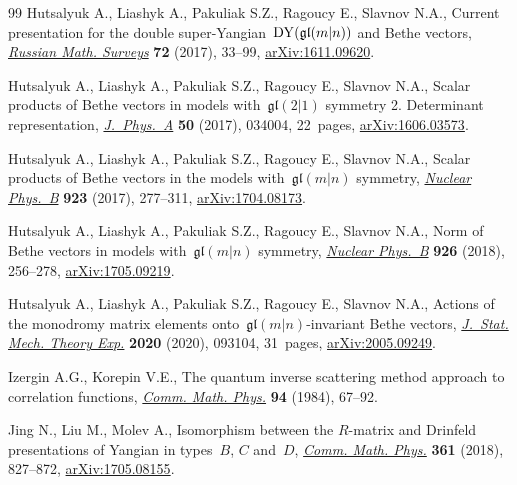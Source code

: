 \documentclass[pdftex]{sigma}
\theoremstyle{definition}
\begin{document}
\begin{thebibliography}{99}
Hutsalyuk A., Liashyk A., Pakuliak S.Z., Ragoucy E., Slavnov N.A., Current
 presentation for the double super-Yangian~${\rm DY}(\mathfrak{gl}(m|n))$ and Bethe
 vectors, \href{https://doi.org/10.1070/RM9754}{\textit{Russian Math.
 Surveys}} \textbf{72} (2017), 33--99,
 \href{http://arxiv.org/abs/1611.09620}{arXiv:1611.09620}.

Hutsalyuk A., Liashyk A., Pakuliak S.Z., Ragoucy E., Slavnov N.A., Scalar
 products of {B}ethe vectors in models with~{$\mathfrak{gl}(2|1)$} symmetry 2.
 {D}eterminant representation,
 \href{https://doi.org/10.1088/1751-8121/50/3/034004}{\textit{J.~Phys.~A}}
 \textbf{50} (2017), 034004, 22~pages,
 \href{http://arxiv.org/abs/1606.03573}{arXiv:1606.03573}.

Hutsalyuk A., Liashyk A., Pakuliak S.Z., Ragoucy E., Slavnov N.A., Scalar
 products of {B}ethe vectors in the models with~$\mathfrak{gl}(m|n)$ symmetry,
 \href{https://doi.org/10.1016/j.nuclphysb.2017.07.020}{\textit{Nuclear
 Phys.~B}} \textbf{923} (2017), 277--311,
 \href{http://arxiv.org/abs/1704.08173}{arXiv:1704.08173}.

Hutsalyuk A., Liashyk A., Pakuliak S.Z., Ragoucy E., Slavnov N.A., Norm of
 {B}ethe vectors in models with~{$\mathfrak{gl}(m|n)$} symmetry,
 \href{https://doi.org/10.1016/j.nuclphysb.2017.11.006}{\textit{Nuclear
 Phys.~B}} \textbf{926} (2018), 256--278,
 \href{http://arxiv.org/abs/1705.09219}{arXiv:1705.09219}.

Hutsalyuk A., Liashyk A., Pakuliak S.Z., Ragoucy E., Slavnov N.A., Actions of
 the monodromy matrix elements onto~{$\mathfrak{gl}(m|n)$}-invariant {B}ethe
 vectors, \href{https://doi.org/10.1088/1742-5468/abacb2}{\textit{J.~Stat.
 Mech. Theory Exp.}} \textbf{2020} (2020), 093104, 31~pages,
 \href{http://arxiv.org/abs/2005.09249}{arXiv:2005.09249}.

Izergin A.G., Korepin V.E., The quantum inverse scattering method approach to
 correlation functions,
 \href{https://doi.org/10.1007/BF01212350}{\textit{Comm. Math. Phys.}}
 \textbf{94} (1984), 67--92.

Jing N., Liu M., Molev A., Isomorphism between the {$R$}-matrix and {D}rinfeld
 presentations of {Y}angian in types~{$B$}, {$C$} and~{$D$},
 \href{https://doi.org/10.1007/s00220-018-3185-x}{\textit{Comm. Math. Phys.}}
 \textbf{361} (2018), 827--872,
 \href{http://arxiv.org/abs/1705.08155}{arXiv:1705.08155}.


\end{thebibliography}
\end{document}
